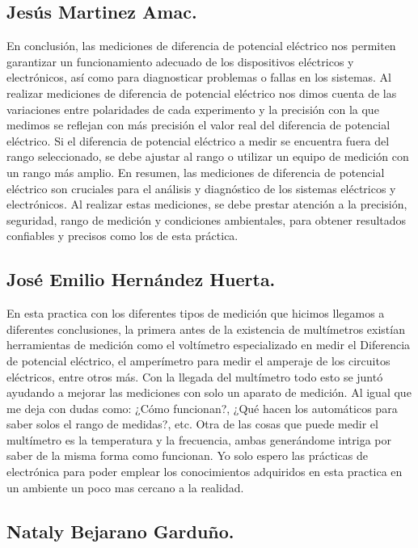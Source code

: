 \documentclass[10pt]{article}
\begin{document}
\begin{multicols}{2}
\subsection*{Jesús Martinez Amac.}
En conclusión, las mediciones de diferencia de potencial eléctrico nos permiten garantizar un funcionamiento adecuado de los dispositivos eléctricos y electrónicos, así como para diagnosticar problemas o fallas en los sistemas.
Al realizar mediciones de diferencia de potencial eléctrico nos dimos cuenta de las variaciones entre polaridades de cada experimento y la precisión con la que medimos se reflejan con más precisión el valor real del diferencia de potencial eléctrico.
 Si el diferencia de potencial eléctrico a medir se encuentra fuera del rango seleccionado, se debe ajustar al rango o utilizar un equipo de medición con un rango más amplio.
En resumen, las mediciones de diferencia de potencial eléctrico son cruciales para el análisis y diagnóstico de los sistemas eléctricos y electrónicos. Al realizar estas mediciones, se debe prestar atención a la precisión, seguridad, rango de medición y condiciones ambientales, para obtener resultados confiables y precisos como los de esta práctica.
\subsection*{José Emilio Hernández Huerta.}
En esta practica con los diferentes tipos de medición que hicimos llegamos a diferentes conclusiones, la primera antes de la existencia de multímetros existían herramientas de medición como el voltímetro especializado en medir el Diferencia de potencial eléctrico, el amperímetro para medir el amperaje de los circuitos eléctricos, entre otros más. Con la llegada del multímetro todo esto se juntó ayudando a mejorar las mediciones con solo un aparato de medición. Al igual que me deja con dudas como: ¿Cómo funcionan?, ¿Qué hacen los automáticos para saber solos el rango de medidas?, etc. Otra de las cosas que puede medir el multímetro es la temperatura y la frecuencia, ambas generándome intriga por saber de la misma forma como funcionan. Yo solo espero las prácticas de electrónica para poder emplear los conocimientos adquiridos en esta practica en un ambiente un poco mas cercano a la realidad. 
\subsection*{Nataly Bejarano Garduño.}

\end{multicols}
\end{document}
